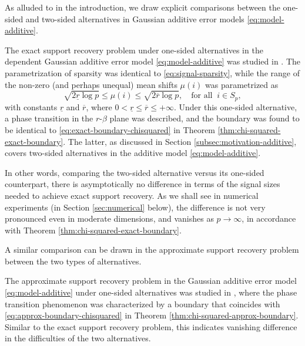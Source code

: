 

As alluded to in the introduction, we draw explicit comparisons between the one-sided and two-sided alternatives in Gaussian additive error models \eqref{eq:model-additive}.

\begin{remark} \label{rmk:strong-classification-boundary-1}
The exact support recovery problem under one-sided alternatives in the dependent Gaussian additive error model \eqref{eq:model-additive} was studied in \cite{gao2018fundamental}. 
The parametrization of sparsity was identical to \eqref{eq:signal-sparsity}, while the range of the non-zero (and perhaps unequal) mean shifts $\mu(i)$ was parametrized as
\begin{equation} \label{eq:signal-size-additive}
    \sqrt{2\underline{r}\log{p}}
    \le \mu(i) \le
    \sqrt{2\overline{r}\log{p}}, \quad \text{for all}\;\;i\in S_p,
\end{equation}
with constants $\underline{r}$ and $\overline{r}$, where $0<\underline{r}\le\overline{r}\le+\infty$.
Under this one-sided alternative, a phase transition in the $r$-$\beta$ plane was described, and the boundary was found to be identical to \eqref{eq:exact-boundary-chisquared} in Theorem \ref{thm:chi-squared-exact-boundary}. The latter, as discussed in Section \ref{subsec:motivation-additive}, covers two-sided alternatives in the additive model \eqref{eq:model-additive}.

In other words, comparing the two-sided alternative versus its one-sided counterpart, there is asymptotically no difference in terms of the signal sizes needed to achieve exact support recovery.
As we shall see in numerical experiments (in Section \ref{sec:numerical} below), the difference is not very pronounced even in moderate dimensions, and vanishes as $p\to\infty$, in accordance with Theorem \ref{thm:chi-squared-exact-boundary}.
\end{remark}

A similar comparison can be drawn in the approximate support recovery problem between the two types of alternatives.

\begin{remark} \label{rmk:weak-classification-boundary}
The approximate support recovery problem in the Gaussian additive error model \eqref{eq:model-additive} under one-sided alternatives was studied in \cite{arias2017distribution}, 
where the phase transition phenomenon was characterized by a boundary that coincides with \eqref{eq:approx-boundary-chisquared} in Theorem \ref{thm:chi-squared-approx-boundary}.
Similar to the exact support recovery problem, this indicates vanishing difference in the difficulties of the two alternatives.
\end{remark}

